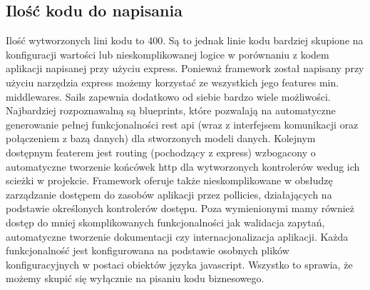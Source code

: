 \documentclass[12pt]{report}
\begin{document}
    \subsection{Ilość kodu do napisania}
      Ilość wytworzonych lini kodu to 400.
      Są to jednak linie kodu bardziej skupione na konfiguracji wartości lub nieskomplikowanej logice w porównaniu z kodem aplikacji napisanej przy użyciu express.
      Ponieważ framework został napisany przy użyciu narzędzia express możemy korzystać ze wszystkich jego features min. middlewares.
      Sails zapewnia dodatkowo od siebie bardzo wiele możliwości.
      Najbardziej rozpoznawalną są blueprints, które pozwalają na automatyczne generowanie pełnej funkcjonalności rest api (wraz z interfejsem komunikacji oraz połączeniem z bazą danych) dla stworzonych modeli danych.
      Kolejnym dostępnym featerem jest routing (pochodzący z express) wzbogacony o automatyczne tworzenie końcówek http dla wytworzonych kontrolerów wedug ich scieżki w projekcie.
      Framework oferuje także nieskomplikowane w obsłudzę zarządzanie dostępem do zasobów aplikacji przez pollicies, działających na podstawie określonych kontrolerów dostępu.
      Poza wymienionymi mamy również dostęp do mniej skomplikowanych funkcjonalności jak walidacja zapytań, automatyczne tworzenie dokumentacji czy internacjonalizacja aplikacji.
      Każda funkcjonalność jest konfigurowana na podstawie osobnych plików konfiguracyjnych w postaci obiektów języka javascript.
      Wszystko to sprawia, że możemy skupić się wyłącznie na pisaniu kodu biznesowego.
\end{document}
